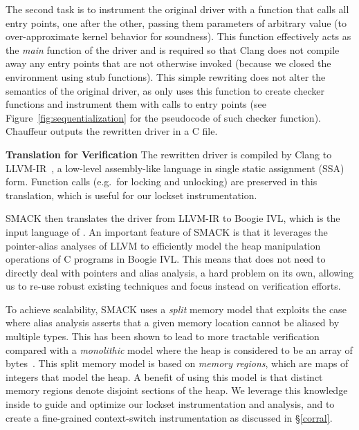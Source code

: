   The second task is to instrument the original driver with a function that calls all entry points, one after the other, passing them parameters of arbitrary value (to over-approximate kernel behavior for soundness). This function effectively acts as the \emph{main} function of the driver and is required so that Clang does not compile away any entry points that are not otherwise invoked (because we closed the environment using stub functions).   This simple rewriting does not alter the semantics of the original driver, as \whoop only uses this function to create checker functions and instrument them with calls to entry points (see Figure~\ref{fig:sequentialization} for the pseudocode of such checker function). Chauffeur outputs the rewritten driver in a C file.

\medskip\noindent\textbf{Translation for Verification }
%
The rewritten driver is compiled by Clang to LLVM-IR~\cite{lattner2004llvm}, a low-level assembly-like language in single static assignment (SSA) form. Function calls (e.g.\ for locking and unlocking) are preserved in this translation, which is useful for our lockset instrumentation.

SMACK then translates the driver from LLVM-IR to Boogie IVL, which is the input language of \whoop. An important feature of SMACK is that it leverages the pointer-alias analyses of LLVM to efficiently model the heap manipulation operations of C programs in Boogie IVL. This means that \whoop does not need to directly deal with pointers and alias analysis, a hard problem on its own, allowing us to re-use robust existing techniques and focus instead on verification efforts.

To achieve scalability, SMACK uses a \emph{split} memory model that exploits the case where
alias analysis asserts that a given memory location cannot be aliased by multiple types.
This has been shown to lead to more tractable verification compared with a \emph{monolithic} model where the heap is considered to be an array of bytes~\cite{rakamaric2009scalable}. This split memory model is based on \emph{memory regions}, which are maps of integers that model the heap. A benefit of using this model is that distinct memory regions denote disjoint sections of the heap. We leverage this knowledge inside \whoop to guide and optimize our lockset instrumentation and analysis, and to create a fine-grained context-switch instrumentation as discussed in \S\ref{corral}.

